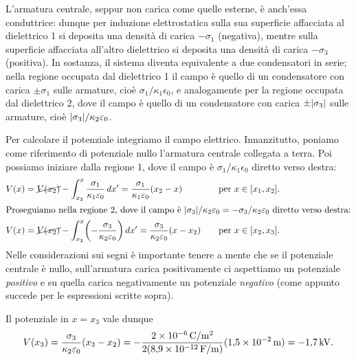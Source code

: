 \documentclass[10pt]{gulartcl}
\begin{document}
\begin{solution}
L’armatura centrale, seppur non carica come quelle esterne, è anch’essa
conduttrice: dunque per induzione elettrostatica sulla sua superficie
affacciata al dielettrico 1 si deposita una densità di carica $-\sigma_1$
(negativa), mentre sulla superficie affacciata all’altro dielettrico si
deposita una densità di carica $-\sigma_3$ (positiva). In sostanza, il
sistema diventa equivalente a due condensatori in serie; nella regione
occupata dal dielettrico 1 il campo è quello di un condensatore con carica
$\pm \sigma_1$ sulle armature, cioè $\sigma_1 / \kappa_1 \epsilon_0$, e
analogamente per la regione occupata dal dielettrico 2, dove il campo è
quello di un condensatore con carica $\pm \abs{\sigma_3}$ sulle armature,
cioè $\abs{\sigma_3} / \kappa_2 \epsilon_0$.

Per calcolare il potenziale integriamo il campo elettrico. Innanzitutto,
poniamo come riferimento di potenziale nullo l’armatura centrale collegata
a terra. Poi possiamo iniziare dalla regione 1, dove il campo è $\sigma_1 /
\kappa_1 \epsilon_0$ diretto verso destra:
\begin{alignat}{2}
    V(x) &= \cancel{V(x_2)}
            -\int_{x_2}^{x} \frac{\sigma_1}{\kappa_1 \epsilon_0} \, dx'
          = \frac{\sigma_1}{\kappa_1 \epsilon_0} (x_2 - x)
         && \quad \text{per } x \in [x_1, x_2]. \\
\intertext{Proseguiamo nella regione 2, dove il campo è $\abs{\sigma_3} /
\kappa_2 \epsilon_0 = -\sigma_3 / \kappa_2 \epsilon_0$ diretto verso
destra:}
    V(x) &= \cancel{V(x_2)} -\int_{x_2}^{x}
            \biggl(-\frac{\sigma_3}{\kappa_2 \epsilon_0}\biggr) \, dx'
          = \frac{\sigma_3}{\kappa_2 \epsilon_0}(x - x_2)
         && \quad \text{per } x \in [x_2, x_3].
\end{alignat}
Nelle considerazioni sui segni è importante tenere a mente che se il
potenziale centrale è nullo, sull’armatura carica positivamente ci
aspettiamo un potenziale \emph{positivo} e su quella carica negativamente
un potenziale \emph{negativo} (come appunto succede per le espressioni
scritte sopra).

Il potenziale in $x = x_3$ vale dunque
\begin{equation}
    V(x_3) = \frac{\sigma_3}{\kappa_2 \varepsilon_0}(x_3 - x_2)
          = - \frac{\qty{2e-6}{C \per m\squared}}{2(\qty{8.9e-12}{F/m})} 
            (\qty{1.5e-2}{m})
          = -\qty{1.7}{kV}.
\end{equation}


\end{solution}
\end{document}
